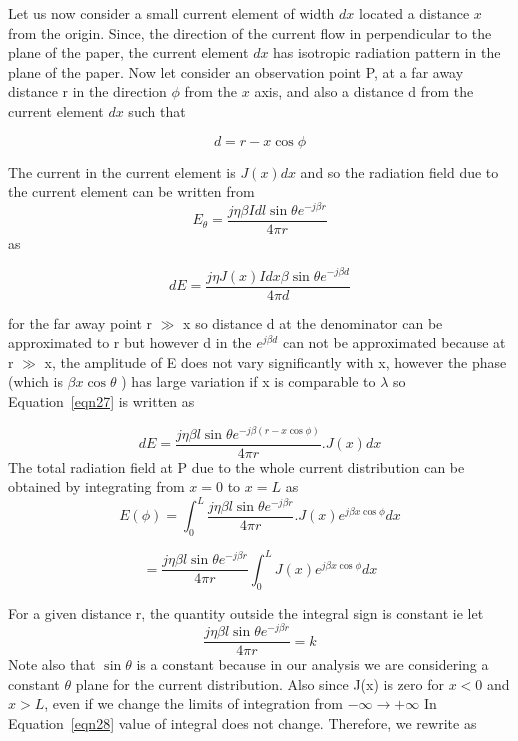 Let us now consider a small current element of width $dx$ located a distance $x$ from the origin. Since, the direction of the current flow in perpendicular to the plane of the paper, the current element $dx$ has isotropic radiation pattern in the plane of the paper. Now let consider an observation  point P, at a far away distance r in the direction $\phi$ from the $x$ axis, and also a distance d from the current element $dx$ such that

$$d= r- x\cos\phi$$

The  current in the current element is $J(x)dx$ and so the radiation field due to the current element can be written from $$ E_\theta = \dfrac{j\eta\beta Idl\sin\theta e^{-j\beta r}}{4\pi r} $$
as

\begin{equation}
dE = \dfrac{j\eta J(x) Idx\beta\sin\theta e^{-j\beta d}}{4\pi d}
\label{eqn27}
\end{equation} 

for the far away point r $\gg$ x so distance d at the denominator can  be approximated to r but however d in the $ e^{j\beta d}$ can not be approximated because at r $\gg$ x, the amplitude of E does not vary significantly with x, however the phase (which is  $\beta x\cos\theta$ ) has large variation if x is comparable to $\lambda$  so Equation~\ref{eqn27} is written as

$$ dE = \dfrac{j\eta\beta l\sin\theta e^{-j\beta (r-x\cos\phi)}}{4\pi r}.J(x)dx $$
The  total radiation field at P due to the whole current distribution can be obtained by integrating from  $x = 0$ to $x = L$ as 
$$ E(\phi) = \int_{0}^{L}\dfrac{j\eta\beta l\sin\theta e^{-j\beta r}}{4\pi r}. J(x) e^{j\beta x\cos\phi}dx $$  

\begin{equation}
= \dfrac{j\eta\beta l\sin\theta e^{-j\beta r}}{4\pi r}\int_{0}^{L} J(x) e^{j\beta x \cos\phi}dx
\label{eqn28}
\end{equation} 

For a given distance r, the quantity outside the  integral sign is constant ie let $$ \dfrac{j\eta\beta l\sin\theta e^{-j\beta r}}{4\pi r} = k $$
Note also that $\sin\theta$ is a constant because in our analysis we are considering a constant $\theta$ plane for the current distribution.
Also since J(x) is zero for $x < 0$ and $x >L$, even if we change the limits of integration from $ -\infty\to +\infty$ In Equation~\ref{eqn28}  value of integral does not change. Therefore, we rewrite as 

